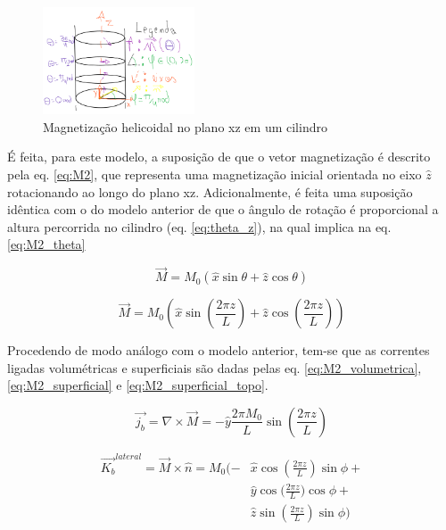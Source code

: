 \documentclass[a4paper, 12pt, twocolumn]{article}
\begin{document}
\begin{figure}
    \caption{Magnetização helicoidal 
    no plano xz em um cilindro}
    \label{fig:magnetizacao_xz}
    \centering
    \includegraphics[width=0.4\textwidth]{magnetizacao_xz.png}
\end{figure}

É feita, para este modelo, a suposição de que o vetor magnetização é descrito pela eq. \ref{eq:M2}, que representa uma magnetização inicial orientada no eixo $\hat{z}$ rotacionando ao longo do plano xz. Adicionalmente, é feita uma suposição idêntica com o do modelo anterior de que o ângulo de rotação é proporcional a altura percorrida no cilindro (eq. \ref{eq:theta_z}), na qual implica na eq. \ref{eq:M2_theta}

\begin{equation} \label{eq:M2}
  \vec{M} = M_0 (\hat{x} \sin{\theta} + \hat{z}\cos{\theta})
\end{equation}

\begin{equation} \label{eq:M2_theta}
  \vec{M} = M_0 (\hat{x} \sin{(\frac{2 \pi z}{L})} + \hat{z}\cos{(\frac{2 \pi z}{L})})
\end{equation}

Procedendo de modo análogo com o modelo anterior, tem-se que as correntes ligadas volumétricas e superficiais são dadas pelas eq. \ref{eq:M2_volumetrica}, \ref{eq:M2_superficial} e \ref{eq:M2_superficial_topo}.

\begin{equation} \label{eq:M2_volumetrica}
  \vec{j_b} = \nabla \times \vec{M} = -\hat{y} \frac{2 \pi M_0}{L}  \sin{(\frac{2 \pi z}{L})}
\end{equation}

\begin{equation} \label{eq:M2_superficial}
\begin{split} 
  \vec{K_b}^{lateral} = \vec{M} \times \hat{n} = M_0(-&\hat{x} \cos{(\frac{2 \pi z}{L})}\sin{\phi} + \\& 
  \hat{y}\cos{(\frac{2 \pi z}{L}})\cos{\phi} + \\& 
  \hat{z} \sin{(\frac{2 \pi z}{L})} \sin{\phi} )
\end{split}
\end{equation}
\end{document}
